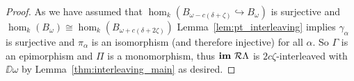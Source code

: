 \begin{proof}
  As we have assumed that $\hom_k(B_{\omega-c(\delta+\zeta)}\hookrightarrow B_\omega)$ is surjective and $\hom_k(B_\omega)\cong\hom_k(B_{\omega+c(\delta+2\zeta)})$ Lemma~\ref{lem:pt_interleaving} implies $\gamma_\alpha$ is surjective and $\pi_\alpha$ is an isomorphism (and therefore injective) for all $\alpha$.
  So $\Gamma$ is an epimorphism and $\Pi$ is a monomorphism, thus $\mathbf{im}~\mathcal{R}\Lambda$ is $2c\zeta$-interleaved with $\DD{\omega}$ by Lemma~\ref{thm:interleaving_main} as desired.
\end{proof}
